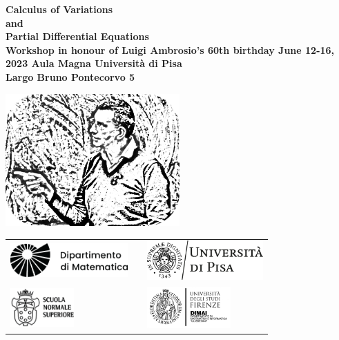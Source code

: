 \documentclass[a4paper, 12pt, oneside]{book}
\begin{document}
\pagestyle{empty}
\setpdftargetpages  %
\begin{center}
    \mbox{}
    \vfill
    \Large\bf
    Calculus of Variations\\ and \\Partial Differential Equations\\
    \vskip 0.5cm
    \large \textbf{Workshop in honour of Luigi Ambrosio's 60th birthday}
    \vskip 0.5cm
    \normalsize
    \textbf{June 12-16, 2023}
    \vskip 0.5cm
    \textbf{Aula Magna Università di Pisa}\\ 
    \textbf{Largo Bruno Pontecorvo 5}    
    
    \vfill

    \includegraphics[width=0.5\textwidth]{ambrosio.png}

    \vfill

    \begin{tabular}{lcl}
    \includegraphics*[height=1.3cm]{matematica_dx_nero.pdf}
    & \hspace{2cm}&
    \includegraphics*[height=1.5cm]{marchio_unipi_orizz_black.png}
    \\
    \includegraphics*[height=1.5cm]{Sns-Scuola-Normale-Superiore-Pisa-black.png}
    & &
    \includegraphics*[height=1.6cm]{logo_DIMAI_negativo-1-768x384.png}
    \end{tabular}
  \end{center}
    
\end{document}
